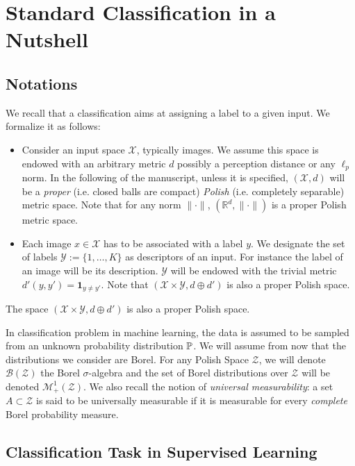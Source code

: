\section{Standard Classification in a Nutshell}

\subsection{Notations}
We recall that a classification aims at assigning a label to a given input. We  formalize it as follows:
\begin{itemize}
    \item Consider an input space $\mathcal{X}$, typically images. We assume this space is endowed with an arbitrary metric $d$ possibly a perception distance or any $\ell_p$ norm. In the following of the manuscript, unless it is specified, $(\mathcal{X},d)$ will be a \textit{proper} (i.e. closed balls are compact) \textit{Polish} (i.e. completely separable) metric space. Note that for any norm $\lVert\cdot\rVert$,  $(\mathbb{R}^d,\lVert\cdot\rVert)$ is a proper Polish metric space.
    \item Each image $x\in \mathcal{X}$ has to be associated with a label $y$. We designate the set of labels $\mathcal{Y}:=\{1,\dots,K\}$ as descriptors of an input. For instance the label of an image will be its description. $\mathcal{Y}$ will be endowed with the trivial metric  $d'(y,y') = \mathbf{1}_{y\neq y'}$. Note that $(\mathcal{X}\times\mathcal{Y},d\oplus d')$ is also a proper Polish space.
\end{itemize}
The space $(\mathcal{X}\times\mathcal{Y},d\oplus d')$ is also a proper Polish space. 

In classification problem in machine learning, the data is assumed to be sampled from an unknown probability distribution $\mathbb{P}$. We will assume from now that the distributions we consider are Borel. For any Polish Space $\mathcal{Z}$, we will denote $\mathcal{B}(\mathcal{Z})$ the Borel $\sigma$-algebra and the set of Borel distributions over $\mathcal{Z}$  will be denoted $\mathcal{M}_+^1(\mathcal{Z})$. We also recall the notion of \textit{universal measurability}: a set $A\subset \mathcal{Z}$ is said to be universally measurable if it is measurable for every \textit{complete} Borel probability measure.


\subsection{Classification Task in Supervised Learning}


